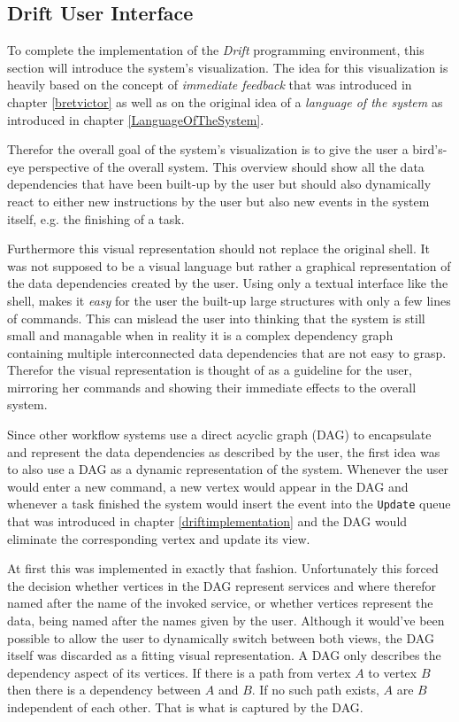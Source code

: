 \subsection{Drift User Interface}
\label{driftui}

To complete the implementation of the \textit{Drift} programming
environment, this section will introduce the system's visualization.
The idea for this visualization is heavily based on the concept
of \textit{immediate feedback} that was introduced in chapter \ref{bretvictor}
as well as on the original idea of a \textit{language of the system}
as introduced in chapter \ref{LanguageOfTheSystem}.

Therefor the overall goal of the system's visualization is to
give the user a bird's-eye perspective of the overall system.
This overview should show all the data dependencies that have
been built-up by the user but should also dynamically react
to either new instructions by the user but also new events in
the system itself, e.g. the finishing of a task.

Furthermore this visual representation should not replace the
original shell. It was not supposed to be a visual language
but rather a graphical representation of the data
dependencies created by the user. Using only a textual interface
like the shell, makes it \textit{easy} for the user the built-up
large structures with only a few lines of commands. This can
mislead the user into thinking that the system is still small
and managable when in reality it is a complex dependency graph
containing multiple interconnected data dependencies that
are not easy to grasp. Therefor the visual representation
is thought of as a guideline for the user, mirroring her commands
and showing their immediate effects to the overall system.
\newline

Since other workflow systems use a direct acyclic graph (DAG)
to encapsulate and represent the data dependencies as described
by the user, the first idea was to also use a DAG as a dynamic
representation of the system. Whenever the user would enter a new command,
a new vertex would appear in the DAG and whenever a task finished
the system would insert the event into the \texttt{Update} queue
that was introduced in chapter \ref{driftimplementation} and the
DAG would eliminate the corresponding vertex and update its view.

At first this was implemented in exactly that fashion. Unfortunately
this forced the decision whether vertices in the DAG represent
services and where therefor named after the name of the invoked
service, or whether vertices represent the data, being named after
the names given by the user. Although it would've been possible
to allow the user to dynamically switch between both views,
the DAG itself was discarded as a fitting visual representation.
A DAG only describes the dependency aspect of its vertices.
If there is a path from vertex $A$ to vertex $B$ then there is
a dependency between $A$ and $B$. If no such path exists, $A$
are $B$ independent of each other. That is what is captured by
the DAG.

